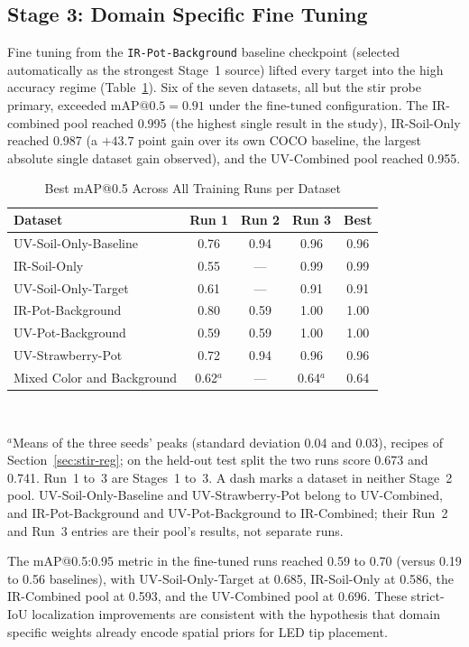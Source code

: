 ﻿\documentclass[journal]{IEEEtran}
\begin{document}
\subsection{Stage 3: Domain Specific Fine Tuning}
Fine tuning from the \texttt{IR-Pot-Background} baseline checkpoint (selected automatically as the strongest Stage~1 source) lifted every target into the high accuracy regime (Table~\ref{tab:best}). Six of the seven datasets, all but the stir probe primary, exceeded $\text{mAP@0.5}=0.91$ under the fine-tuned configuration. The IR-combined pool reached 0.995 (the highest single result in the study), IR-Soil-Only reached 0.987 (a $+43.7$ point gain over its own COCO baseline, the largest absolute single dataset gain observed), and the UV-Combined pool reached 0.955.

\begin{table}[!t]
\renewcommand{\arraystretch}{1.3}
\caption{Best mAP@0.5 Across All Training Runs per Dataset}
\label{tab:best}
\centering
\begin{tabular}{l c c c c}
\toprule
\textbf{Dataset} & \textbf{Run 1} & \textbf{Run 2} & \textbf{Run 3} & \textbf{Best} \\
\midrule
UV-Soil-Only-Baseline & 0.76 & 0.94 & 0.96 & 0.96 \\
IR-Soil-Only & 0.55 & --- & 0.99 & 0.99 \\
UV-Soil-Only-Target & 0.61 & --- & 0.91 & 0.91 \\
IR-Pot-Background & 0.80 & 0.59 & 1.00 & 1.00 \\
UV-Pot-Background & 0.59 & 0.59 & 1.00 & 1.00 \\
UV-Strawberry-Pot & 0.72 & 0.94 & 0.96 & 0.96 \\
Mixed Color and Background & 0.62$^{a}$ & --- & 0.64$^{a}$ & 0.64 \\
\bottomrule
\end{tabular}
\\[2pt]
\parbox{\columnwidth}{\footnotesize $^{a}$Means of the three seeds' peaks (standard deviation 0.04 and 0.03), recipes of Section~\ref{sec:stir-reg}; on the held-out test split the two runs score 0.673 and 0.741. Run~1 to~3 are Stages~1 to~3. A dash marks a dataset in neither Stage~2 pool. UV-Soil-Only-Baseline and UV-Strawberry-Pot belong to UV-Combined, and IR-Pot-Background and UV-Pot-Background to IR-Combined; their Run~2 and Run~3 entries are their pool's results, not separate runs.}
\end{table}

The mAP@0.5:0.95 metric in the fine-tuned runs reached 0.59 to 0.70 (versus 0.19 to 0.56 baselines), with UV-Soil-Only-Target at 0.685, IR-Soil-Only at 0.586, the IR-Combined pool at 0.593, and the UV-Combined pool at 0.696. These strict-IoU localization improvements are consistent with the hypothesis that domain specific weights already encode spatial priors for LED tip placement.
\end{document}
